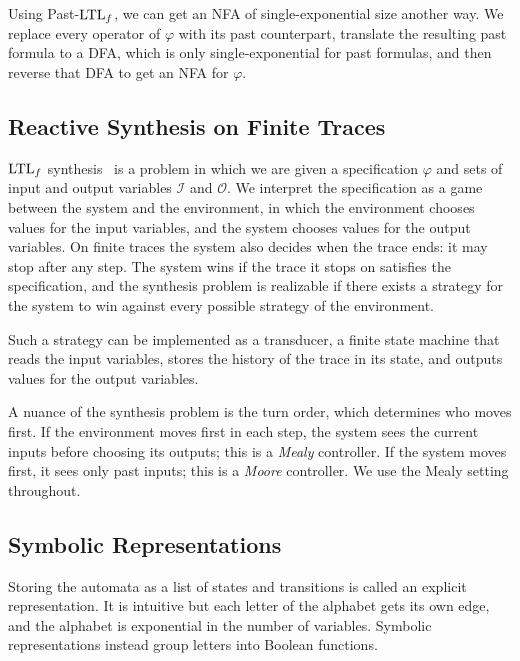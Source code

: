 Using Past-$\text{LTL}_f$, we can get an NFA of single-exponential size another way.
We replace every operator of $\varphi$ with its past counterpart, translate the resulting past formula to a DFA, which is only single-exponential for past formulas, and then reverse that DFA to get an NFA for $\varphi$.

\subsection{Reactive Synthesis on Finite Traces}

$\text{LTL}_f$ synthesis~\cite{PnueliRosner1989,DeGiacomoVardi2015} is a problem in which we are given a specification $\varphi$ and sets of input and output variables $\mathcal{I}$ and $\mathcal{O}$.
We interpret the specification as a game between the system and the environment, in which the environment chooses values for the input variables, and the system chooses values for the output variables.
On finite traces the system also decides when the trace ends: it may stop after any step.
The system wins if the trace it stops on satisfies the specification, and the synthesis problem is realizable if there exists a strategy for the system to win against every possible strategy of the environment.

Such a strategy can be implemented as a transducer, a finite state machine that reads the input variables, stores the history of the trace in its state, and outputs values for the output variables.

A nuance of the synthesis problem is the turn order, which determines who moves first.
If the environment moves first in each step, the system sees the current inputs before choosing its outputs; this is a \emph{Mealy} controller.
If the system moves first, it sees only past inputs; this is a \emph{Moore} controller.
We use the Mealy setting throughout.

\subsection{Symbolic Representations}

Storing the automata as a list of states and transitions is called an explicit representation.
It is intuitive but each letter of the alphabet gets its own edge, and the alphabet is exponential in the number of variables.
Symbolic representations instead group letters into Boolean functions.

